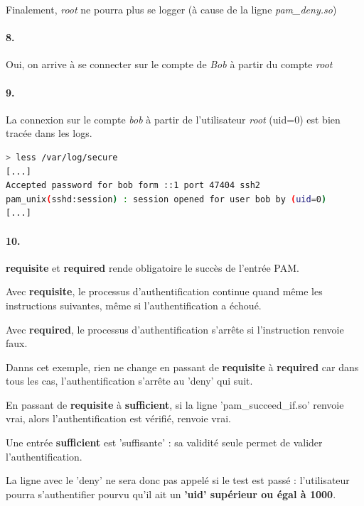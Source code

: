 \documentclass[10pt]{article}
\begin{document}
        Finalement, \textit{root} ne pourra plus se logger (à cause de la ligne \textit{pam\_deny.so})

        
        \paragraph{8.} Oui, on arrive à se connecter sur le compte de \textit{Bob} à partir du compte \textit{root}
        
        \paragraph{9.}
        La connexion sur le compte \textit{bob} à partir de l'utilisateur \textit{root} (uid=0) est bien tracée dans les logs.

\begin{lstlisting}[language=bash]
> less /var/log/secure
[...]
Accepted password for bob form ::1 port 47404 ssh2
pam_unix(sshd:session) : session opened for user bob by (uid=0)
[...]
\end{lstlisting}

        \paragraph{10.}
        \textbf{requisite} et \textbf{required} rende obligatoire le succès de l'entrée PAM.
        
        Avec \textbf{requisite}, le processus d'authentification continue quand même les instructions suivantes, même si l'authentification a échoué.
        
        Avec \textbf{required}, le processus d'authentification s'arrête si l'instruction renvoie faux.
        
        Danns cet exemple, rien ne change en passant de \textbf{requisite} à \textbf{required} car dans tous les cas, l'authentification s'arrête au 'deny' qui suit.

        En passant de \textbf{requisite} à \textbf{sufficient}, si la ligne 'pam\_succeed\_if.so' renvoie vrai, alors l'authentification est vérifié, renvoie vrai.
        
        Une entrée \textbf{sufficient} est 'suffisante' : sa validité seule permet de valider l'authentification.
        
        La ligne avec le 'deny' ne sera donc pas appelé si le test est passé : l'utilisateur pourra s'authentifier pourvu qu'il ait un \textbf{'uid' supérieur ou égal à 1000}.
 
\end{document}
